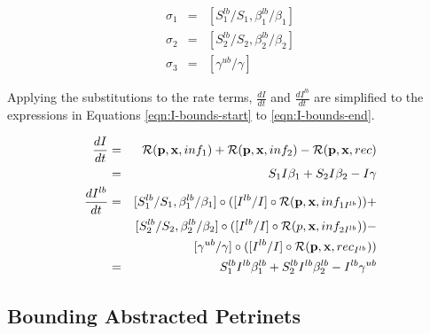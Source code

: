 \begin{eqnarray}\label{eqn:I-subs-start}
     \sigma_{1} &=& [S_1^{lb}/S_1,  \beta_1^{lb}/\beta_1]\\
    \sigma_{2} &=& [S_2^{lb}/S_2, \beta_2^{lb}/\beta_2]\\
    \sigma_{3} &=& [ \gamma^{ub}/\gamma]\label{eqn:I-subs-end}
\end{eqnarray}

Applying the substitutions to the rate terms,  $\frac{dI}{dt}$ and $\frac{dI^{lb}}{dt}$ are simplified to the expressions in Equations \ref{eqn:I-bounds-start} to \ref{eqn:I-bounds-end}.

\begin{eqnarray}\label{eqn:I-bounds-start}
    \frac{dI}{dt} &=& {\cal R}({\bf p}, {\bf x}, inf_1) + {\cal R}({\bf p}, {\bf x}, inf_2) -  {\cal R}({\bf p}, {\bf x}, rec)\\
    &=& S_1I\beta_1 + S_2I\beta_2 - I\gamma\\
    \frac{dI^{lb}}{dt} &=& [S_1^{lb}/S_1,  \beta_1^{lb}/\beta_1] \circ ([I^{lb}/I] \circ {\cal R}({\bf p}, {\bf x}, inf_{1 I^{lb}})) + \\
    && [S_2^{lb}/S_2, \beta_2^{lb}/\beta_2] \circ ([I^{lb}/I] \circ {\cal R}({ p}, {\bf x}, inf_{2 I^{lb}})) -  \\
    && [ \gamma^{ub}/\gamma] \circ ([I^{lb}/I] \circ {\cal R}({\bf p}, {\bf x}, rec_{I^{lb}}))\\
    &=&S_1^{lb}I^{lb}\beta_1^{lb} + S_2^{lb}I^{lb}\beta_2^{lb} - I^{lb}\gamma^{ub} \label{eqn:I-bounds-end}
\end{eqnarray}

\subsection{Bounding Abstracted Petrinets}

